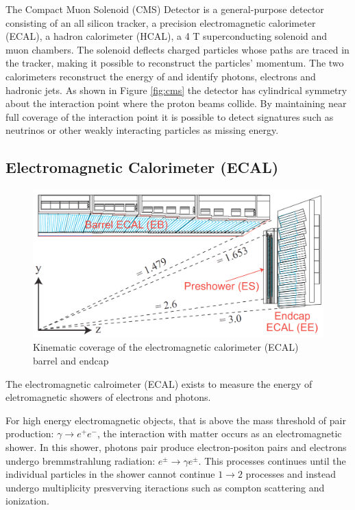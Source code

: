 The Compact Muon Solenoid (CMS) Detector is a general-purpose detector consisting of 
an all silicon tracker, a precision electromagnetic calorimeter (ECAL), a hadron calorimeter
 (HCAL), a 4 T superconducting solenoid and muon chambers. The solenoid deflects charged
 particles whose paths are traced in the tracker, making it possible to 
reconstruct the particles’ momentum. The two calorimeters reconstruct the energy 
of and identify photons, electrons and hadronic jets.
As shown in Figure \ref{fig:cms} the detector has cylindrical symmetry about the
 interaction point where the proton beams collide. By maintaining near full coverage 
of the interaction point it is possible to detect signatures such as neutrinos or other weakly interacting particles as missing energy. 

\subsection{Electromagnetic Calorimeter (ECAL)}


\begin{figure}
\begin{center}
\includegraphics[width=.95\textwidth]{pics/ecal_diagram_side}
\end{center}
\caption{Kinematic coverage of the electromagnetic calorimeter (ECAL) barrel and endcap}
\label{fig:ecal}
\end{figure}

The electromagnetic calroimeter (ECAL) exists to measure the energy of eletromagnetic
showers of electrons and photons.  

For high energy electromagnetic objects, that is above the mass threshold of 
pair production: $\gamma \rightarrow e^+e^-$, the interaction with matter occurs as an electromagnetic shower. In this shower, photons pair produce electron-positon pairs and
 electrons undergo bremmstrahlung 
radiation: $e^\pm \rightarrow \gamma e^\pm$. This processes continues until 
the individual particles in the shower cannot continue $1\rightarrow 2$
 processes and instead undergo multiplicity presverving iteractions such 
as compton scattering and ionization.

